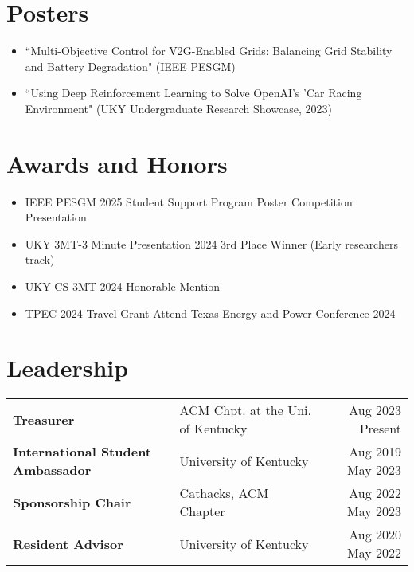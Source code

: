 \documentclass[a4paper,12pt]{article}
\begin{document}
\section{Posters}
\begin{itemize}[nosep,after=\strut, leftmargin=1em, itemsep=3pt,label=--]
\item ``Multi-Objective Control for V2G-Enabled Grids: Balancing Grid Stability and Battery Degradation" (IEEE PESGM) %
\item ``Using Deep Reinforcement Learning to Solve OpenAI's 'Car Racing Environment" (UKY Undergraduate Research Showcase, 2023) %
\end{itemize}

\section{Awards and Honors}
\begin{itemize}[nosep,after=\strut, leftmargin=1em, itemsep=3pt,label=--]
\item IEEE PESGM 2025 Student Support Program Poster Competition Presentation %
\item UKY 3MT-3 Minute Presentation 2024 3rd Place Winner (Early researchers track) %
\item UKY CS 3MT 2024 Honorable Mention %
\item TPEC 2024 Travel Grant Attend Texas Energy and Power Conference 2024 %
\end{itemize}

\section{Leadership}
\begin{tabularx}{\linewidth}{@{}l X r@{}}
\textbf{Treasurer} & ACM Chpt. at the Uni. of Kentucky & Aug 2023 Present \\ %
\textbf{International Student Ambassador} & University of Kentucky & Aug 2019 May 2023 \\ %
\textbf{Sponsorship Chair} & Cathacks, ACM Chapter & Aug 2022 May 2023 \\ %
\textbf{Resident Advisor} & University of Kentucky & Aug 2020 May 2022 \\ %
\end{tabularx}




\end{document}

